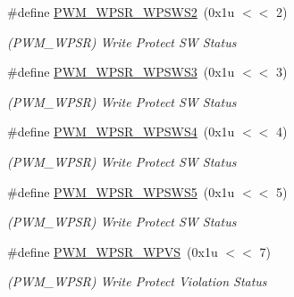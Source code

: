 \begin{DoxyCompactItemize}
\mbox{\label{group__SAME70__PWM_ga232173f80b5d95a0dc3f3e3ed98973de}} 
\#define \mbox{\hyperlink{group__SAME70__PWM_ga232173f80b5d95a0dc3f3e3ed98973de}{P\+W\+M\+\_\+\+W\+P\+S\+R\+\_\+\+W\+P\+S\+W\+S2}}~(0x1u $<$$<$ 2)
\begin{DoxyCompactList}\small\item\em (P\+W\+M\+\_\+\+W\+P\+SR) Write Protect SW Status \end{DoxyCompactList}\item 
\mbox{\label{group__SAME70__PWM_gab2c27c13adebee1cdd31dfe24d11d747}} 
\#define \mbox{\hyperlink{group__SAME70__PWM_gab2c27c13adebee1cdd31dfe24d11d747}{P\+W\+M\+\_\+\+W\+P\+S\+R\+\_\+\+W\+P\+S\+W\+S3}}~(0x1u $<$$<$ 3)
\begin{DoxyCompactList}\small\item\em (P\+W\+M\+\_\+\+W\+P\+SR) Write Protect SW Status \end{DoxyCompactList}\item 
\mbox{\label{group__SAME70__PWM_ga5d1554655175492c6bf1cc86448650ef}} 
\#define \mbox{\hyperlink{group__SAME70__PWM_ga5d1554655175492c6bf1cc86448650ef}{P\+W\+M\+\_\+\+W\+P\+S\+R\+\_\+\+W\+P\+S\+W\+S4}}~(0x1u $<$$<$ 4)
\begin{DoxyCompactList}\small\item\em (P\+W\+M\+\_\+\+W\+P\+SR) Write Protect SW Status \end{DoxyCompactList}\item 
\mbox{\label{group__SAME70__PWM_ga0768cfcf47672715e0123a7fb345e3c8}} 
\#define \mbox{\hyperlink{group__SAME70__PWM_ga0768cfcf47672715e0123a7fb345e3c8}{P\+W\+M\+\_\+\+W\+P\+S\+R\+\_\+\+W\+P\+S\+W\+S5}}~(0x1u $<$$<$ 5)
\begin{DoxyCompactList}\small\item\em (P\+W\+M\+\_\+\+W\+P\+SR) Write Protect SW Status \end{DoxyCompactList}\item 
\mbox{\label{group__SAME70__PWM_ga8d57bf1b1bfac2bf2e2e752c5175df37}} 
\#define \mbox{\hyperlink{group__SAME70__PWM_ga8d57bf1b1bfac2bf2e2e752c5175df37}{P\+W\+M\+\_\+\+W\+P\+S\+R\+\_\+\+W\+P\+VS}}~(0x1u $<$$<$ 7)
\begin{DoxyCompactList}\small\item\em (P\+W\+M\+\_\+\+W\+P\+SR) Write Protect Violation Status \end{DoxyCompactList}\item 
$$
\end{DoxyCompactItemize}
